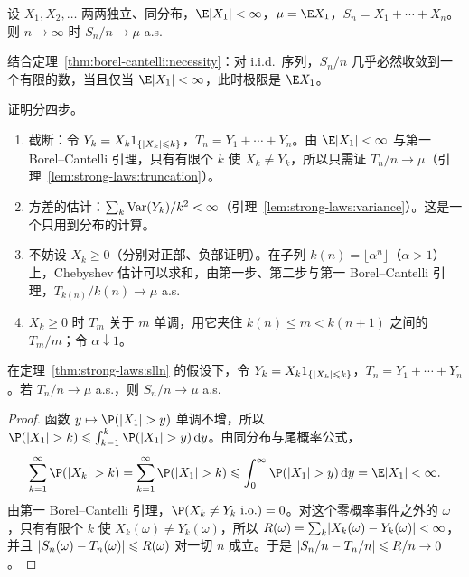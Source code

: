 
\begin{theorem}[强大数定律]\label{thm:strong-laws:slln}
设 $X_1,X_2,\dots$ 两两独立、同分布，$\E\abs{X_1}<\infty$，$\mu=\E X_1$，$S_n=X_1+\cdots+X_n$。则 $n\to\infty$ 时 $S_n/n\to\mu$ a.s.
\end{theorem}

结合定理~\ref{thm:borel-cantelli:necessity}：对 i.i.d.\ 序列，$S_n/n$ 几乎必然收敛到一个有限的数，当且仅当 $\E\abs{X_1}<\infty$，此时极限是 $\E X_1$。

\begin{remark}[证明思路]
证明分四步。
\begin{enumerate}
\item 截断：令 $Y_k=X_k1_{\{\lvert X_k\rvert\leqslant k\}}$，$T_n=Y_1+\cdots+Y_n$。由 $\E\abs{X_1}<\infty$ 与第一 Borel--Cantelli 引理，只有有限个 $k$ 使 $X_k\neq Y_k$，所以只需证 $T_n/n\to\mu$（引理~\ref{lem:strong-laws:truncation}）。
\item 方差的估计：$\sum_k\operatorname{Var}(Y_k)/k^2<\infty$（引理~\ref{lem:strong-laws:variance}）。这是一个只用到分布的计算。
\item 不妨设 $X_k\geqslant0$（分别对正部、负部证明）。在子列 $k(n)=\lfloor\alpha^n\rfloor$（$\alpha>1$）上，Chebyshev 估计可以求和，由第一步、第二步与第一 Borel--Cantelli 引理，$T_{k(n)}/k(n)\to\mu$ a.s.
\item $X_k\geqslant0$ 时 $T_m$ 关于 $m$ 单调，用它夹住 $k(n)\leqslant m<k(n+1)$ 之间的 $T_m/m$；令 $\alpha\downarrow1$。
\end{enumerate}
\end{remark}

\begin{lemma}\label{lem:strong-laws:truncation}
在定理~\ref{thm:strong-laws:slln} 的假设下，令 $Y_k=X_k1_{\{\lvert X_k\rvert\leqslant k\}}$，$T_n=Y_1+\cdots+Y_n$。若 $T_n/n\to\mu$ a.s.，则 $S_n/n\to\mu$ a.s.
\end{lemma}
\begin{proof}
函数 $y\mapsto \P(\abs{X_1}>y)$ 单调不增，所以 $\P(\abs{X_1}>k)\leqslant\int_{k-1}^k\P(\abs{X_1}>y)\dd y$。由同分布与尾概率公式，
\[
\sum_{k=1}^\infty \P(\abs{X_k}>k)=\sum_{k=1}^\infty \P(\abs{X_1}>k)\leqslant\int_0^\infty \P(\abs{X_1}>y)\dd y=\E\abs{X_1}<\infty .
\]
由第一 Borel--Cantelli 引理，$\P(X_k\neq Y_k\ \text{i.o.})=0$。对这个零概率事件之外的 $\omega$，只有有限个 $k$ 使 $X_k(\omega)\neq Y_k(\omega)$，所以 $R(\omega)=\sum_k\lvert X_k(\omega)-Y_k(\omega)\rvert<\infty$，并且 $\lvert S_n(\omega)-T_n(\omega)\rvert\leqslant R(\omega)$ 对一切 $n$ 成立。于是 $\lvert S_n/n-T_n/n\rvert\leqslant R/n\to0$。
\end{proof}

